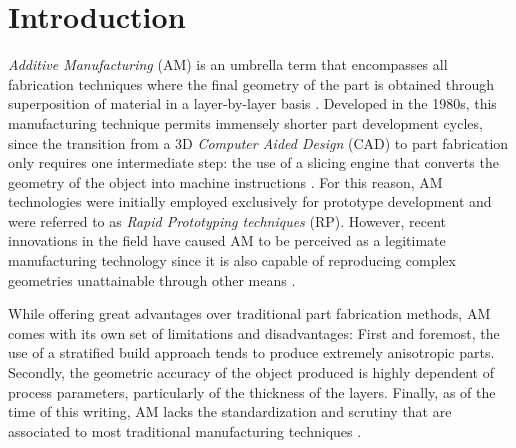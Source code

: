 \documentclass[main.tex]{subfiles}
\begin{document}
\chapter*{Introduction}
 
\emph{Additive Manufacturing} (AM) is an umbrella term that encompasses all fabrication techniques where the final geometry of the part is obtained through superposition of material in a layer-by-layer basis \cite{Gibson2015}. Developed in the 1980s, this manufacturing technique permits immensely shorter part development cycles, since the transition from a 3D \emph{Computer Aided Design} (CAD) to part fabrication only requires one intermediate step: the use of a slicing engine that converts the geometry of the object into machine instructions \cite{Gibson2015}. For this reason, AM technologies were initially employed exclusively for prototype development and were referred to as \emph{Rapid Prototyping techniques} (RP). However, recent innovations in the field have caused AM to be perceived as a legitimate manufacturing technology since it is also capable of reproducing complex geometries unattainable through other means \cite{Gibson2015}.

While offering great advantages over traditional part fabrication methods, AM comes with its own set of limitations and disadvantages: First and foremost, the use of a stratified build approach tends to produce extremely anisotropic parts. Secondly, the geometric accuracy of the object produced is highly dependent of process parameters, particularly of the thickness of the layers. Finally, as of the time of this writing, AM lacks the standardization and scrutiny that are associated to most traditional manufacturing techniques \cite{Gibson2015}.  
\end{document}
